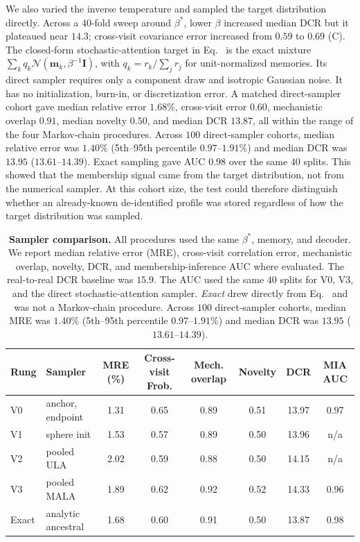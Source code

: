 We also varied the inverse temperature and sampled the target distribution directly.
Across a $40$-fold sweep around $\beta^*$, lower $\beta$ increased median DCR but it plateaued
near $14.3$; cross-visit covariance error increased from $0.59$ to $0.69$
(C). The closed-form stochastic-attention target in
Eq.~ is the exact mixture
$\sum_k q_k\mathcal{N}(\mathbf{m}_k,\beta^{-1}\mathbf{I})$, with
$q_k=r_k/\sum_j r_j$ for unit-normalized memories. Its direct sampler requires only a component
draw and isotropic Gaussian noise. It has no initialization, burn-in, or discretization error.
A matched direct-sampler cohort gave median relative error $1.68\%$, cross-visit error $0.60$,
mechanistic overlap $0.91$, median novelty $0.50$, and median DCR $13.87$, all within the range
of the four Markov-chain procedures. Across $100$ direct-sampler cohorts, median relative error was
$1.40\%$ (5th--95th percentile $0.97$--$1.91\%$) and median DCR was $13.95$
($13.61$--$14.39$). Exact sampling gave AUC $0.98$ over the same $40$ splits. This showed that
the membership signal came from the target distribution, not from the numerical sampler. At
this cohort size, the test could therefore distinguish whether an already-known de-identified
profile was stored regardless of how the target distribution was sampled.

\begin{table}[ht]
\centering
\small
\caption{\textbf{Sampler comparison.} All procedures used the same $\beta^*$, memory,
and decoder. We report median relative error (MRE), cross-visit correlation error,
mechanistic overlap, novelty, DCR, and membership-inference AUC where evaluated. The
real-to-real DCR baseline was $15.9$. The AUC used the same $40$ splits for V0, V3, and the
direct stochastic-attention sampler. \emph{Exact} drew directly from
Eq.~ and was not a
Markov-chain procedure. Across $100$ direct-sampler cohorts, median MRE was $1.40\%$ (5th--95th
percentile $0.97$--$1.91\%$) and median DCR was $13.95$ ($13.61$--$14.39$).}
\label{stab:sampling-ladder}
{\small
\setlength{\tabcolsep}{4pt}
\begin{tabular}{llcccccc}
\hline
Rung & Sampler & MRE (\%) & Cross-visit Frob. & Mech. overlap & Novelty & DCR & MIA AUC \\
\hline
V0 & anchor, endpoint & 1.31 & 0.65 & 0.89 & 0.51 & 13.97 & 0.97 \\
V1 & sphere init      & 1.53 & 0.57 & 0.89 & 0.50 & 13.96 & n/a  \\
V2 & pooled ULA       & 2.02 & 0.59 & 0.88 & 0.50 & 14.15 & n/a  \\
V3 & pooled MALA      & 1.89 & 0.62 & 0.92 & 0.52 & 14.33 & 0.96 \\
\hline
Exact & analytic ancestral & 1.68 & 0.60 & 0.91 & 0.50 & 13.87 & 0.98 \\
\hline
\end{tabular}
}
\end{table}

